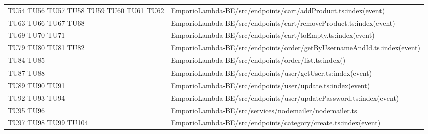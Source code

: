 {\begin{longtable}{C{2cm} C{12.8cm}}
TU54 \newline TU56 \newline TU57 \newline TU58 \newline TU59 \newline TU60 \newline TU61 \newline TU62 & EmporioLambda-BE/src/endpoints/cart/addProduct.ts:index(event)\\

TU63 \newline TU66 \newline TU67 \newline TU68 & EmporioLambda-BE/src/endpoints/cart/removeProduct.ts:index(event)\\

TU69 \newline TU70 \newline TU71 & EmporioLambda-BE/src/endpoints/cart/toEmpty.ts:index(event)\\


TU79 \newline TU80 \newline TU81 \newline TU82 & EmporioLambda-BE/src/endpoints/order/getByUsernameAndId.ts:index(event)\\

TU84 \newline TU85 & EmporioLambda-BE/src/endpoints/order/list.ts:index()\\

TU87 \newline TU88 & EmporioLambda-BE/src/endpoints/user/getUser.ts:index(event)\\

TU89 \newline TU90 \newline TU91 & EmporioLambda-BE/src/endpoints/user/update.ts:index(event)\\

TU92 \newline TU93 \newline TU94 & EmporioLambda-BE/src/endpoints/user/updatePassword.ts:index(event)\\

TU95 \newline TU96 & EmporioLambda-BE/src/services/nodemailer/nodemailer.ts\\

TU97 \newline TU98 \newline TU99 \newline TU104 & EmporioLambda-BE/src/endpoints/category/create.ts:index(event)\\


\end{longtable}}
